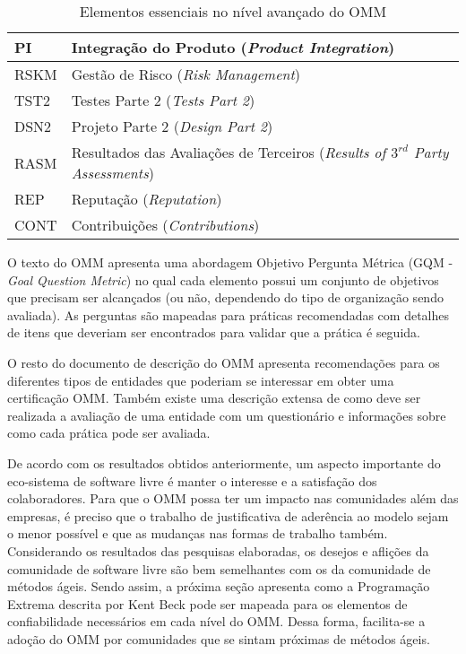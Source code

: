 \begin{table}
  \centering
  \begin{tabular}{|p{2cm}|p{13cm}|}
    \hline
    PI & Integração do Produto
    (\textit{Product Integration}) \\
    \hline
    RSKM & Gestão de Risco
    (\textit{Risk Management}) \\
    \hline
    TST2 & Testes Parte 2
    (\textit{Tests Part 2}) \\
    \hline
    DSN2 & Projeto Parte 2
    (\textit{Design Part 2}) \\
    \hline
    RASM & Resultados das Avaliações de Terceiros
    (\textit{Results of $3^{rd}$ Party Assessments}) \\
    \hline
    REP & Reputação
    (\textit{Reputation}) \\
    \hline
    CONT & Contribuições
    (\textit{Contributions}) \\
    \hline
  \end{tabular}
  \caption{Elementos essenciais no nível avançado do OMM}
  \label{tab:omm-advanced}
\end{table}

O texto do OMM apresenta uma abordagem Objetivo Pergunta Métrica (GQM
- \textit{Goal Question Metric}) no qual cada elemento possui um
conjunto de objetivos que precisam ser alcançados (ou não, dependendo
do tipo de organização sendo avaliada). As perguntas são mapeadas para
práticas recomendadas com detalhes de itens que deveriam ser
encontrados para validar que a prática é seguida.

O resto do documento de descrição do OMM apresenta recomendações para
os diferentes tipos de entidades que poderiam se interessar em obter
uma certificação OMM. Também existe uma descrição extensa de como deve
ser realizada a avaliação de uma entidade com um questionário e
informações sobre como cada prática pode ser avaliada.

De acordo com os resultados obtidos anteriormente, um aspecto
importante do eco-sistema de software livre é manter o interesse e a
satisfação dos colaboradores. Para que o OMM possa ter um impacto nas
comunidades além das empresas, é preciso que o trabalho de
justificativa de aderência ao modelo sejam o menor possível e que as
mudanças nas formas de trabalho também. Considerando os resultados das
pesquisas elaboradas, os desejos e aflições da comunidade de software
livre são bem semelhantes com os da comunidade de métodos ágeis. Sendo
assim, a próxima seção apresenta como a Programação Extrema descrita
por Kent Beck pode ser mapeada para os elementos de confiabilidade
necessários em cada nível do OMM. Dessa forma, facilita-se a adoção do
OMM por comunidades que se sintam próximas de métodos ágeis.

